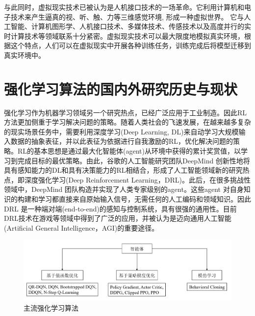 \documentclass[bachelor]{thesis-uestc}
\begin{document}
	与此同时，虚拟现实技术已被认为是人机接口技术的一场革命。它利用计算机和电子技术来产生逼真的视、听、触、力等三维感觉环境, 形成一种虚拟世界。 它与人工智能、计算机图形学、人机接口技术、多媒体技术、传感技术以及高度并行的实时计算技术等领域联系十分紧密。虚拟现实技术可以最大限度地模拟真实环境，根据这个特点，人们可以在虚拟现实中开展各种训练任务，训练完成后将模型迁移到真实环境中。
	
	\section{强化学习算法的国内外研究历史与现状}
	强化学习作为机器学习领域另一个研究热点，已经广泛应用于工业制造。因此RL 方法更加侧重于学习解决问题的策略。随着人类社会的飞速发展，在越来越多复杂的现实场景任务中，需要利用深度学习(Deep Learning, DL)来自动学习大规模输入数据的抽象表征，并以此表征为依据进行自我激励的RL，优化解决问题的策略。RL的基本思想是通过最大化智能体(agent)从环境中获得的累计奖赏值，以学习到完成目标的最优策略\cite{kober2013reinforcement}。由此，谷歌的人工智能研究团队DeepMind 创新性地将具有感知能力的DL和具有决策能力的RL相结合\cite{mnih2013playing}，形成了人工智能领域新的研究热点，即深度强化学习(Deep Reinforcement Learning，DRL)。此后，在很多挑战性领域中，DeepMind 团队构造并实现了人类专家级别的agent。这些agent 对自身知识的构建和学习都直接来自原始输入信号，无需任何的人工编码和领域知识。因此DRL 是一种端对端(end-to-end)的感知与控制系统，具有很强的通用性。目前DRL技术在游戏等领域中得到了广泛的应用，并被认为是迈向通用人工智能(Artificial General Intelligence，AGI)的重要途径。
	
	\begin{figure}
		\includegraphics[width=15cm]{./pic/fg6.jpg}
		\caption{主流强化学习算法}
		\label{fg6}
	\end{figure}
	
\end{document}
